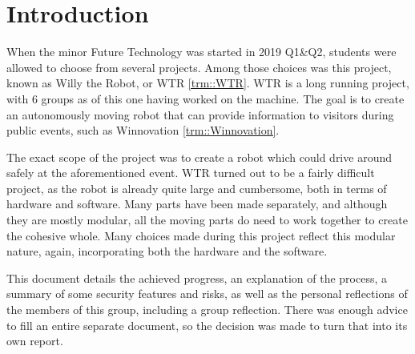 \section{Introduction}
When the minor Future Technology was started in 2019 Q1\&Q2, students were allowed to choose from several projects.
Among those choices was this project, known as Willy the Robot, or WTR \ref{trm::WTR}.
WTR is a long running project, with 6 groups as of this one having worked on the machine.
The goal is to create an autonomously moving robot that can provide information to visitors during public events, such as Winnovation \ref{trm::Winnovation}.

The exact scope of the project was to create a robot which could drive around safely at the aforementioned event.
WTR turned out to be a fairly difficult project, as the robot is already quite large and cumbersome, both in terms of hardware and software.
Many parts have been made separately, and although they are mostly modular, all the moving parts do need to work together to create the cohesive whole.
Many choices made during this project reflect this modular nature, again, incorporating both the hardware and the software.

This document details the achieved progress, an explanation of the process, a summary of some security features and risks, as well as the personal reflections of the members of this group, including a group reflection.
There was enough advice to fill an entire separate document, so the decision was made to turn that into its own report.

\newpage
